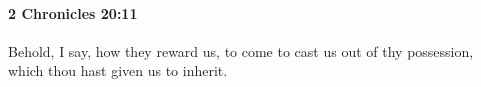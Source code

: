 
		\paragraph{2 Chronicles 20:11} %
			\label{2CHRONICLES-20-11}

			Behold, I say, how they reward us, to come to cast us out of thy possession, which thou hast given us to inherit.


